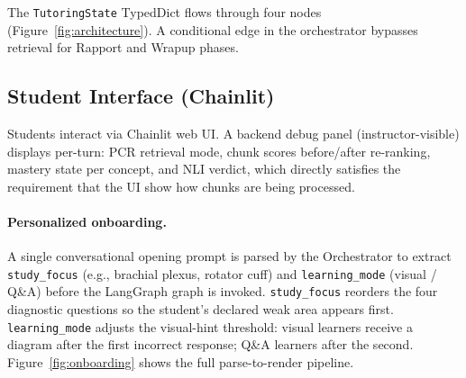 \documentclass[11pt]{article}
\begin{document}
The \texttt{TutoringState} TypedDict flows through four nodes
(Figure~\ref{fig:architecture}).
A conditional edge in the orchestrator bypasses retrieval for Rapport
and Wrapup phases.

\subsection{Student Interface (Chainlit)}

Students interact via Chainlit web UI.
A backend debug panel (instructor-visible) displays per-turn: PCR retrieval
mode, chunk scores before/after re-ranking, mastery state per concept, and
NLI verdict, which directly satisfies the requirement that the UI show how
chunks are being processed.

\paragraph{Personalized onboarding.}
A single conversational opening prompt is parsed by the Orchestrator to
extract \texttt{study\_focus} (e.g., brachial plexus, rotator cuff) and
\texttt{learning\_mode} (visual / Q\&A) before the LangGraph graph is
invoked.
\texttt{study\_focus} reorders the four diagnostic questions so the
student's declared weak area appears first.
\texttt{learning\_mode} adjusts the visual-hint threshold:
visual learners receive a diagram after the first incorrect response;
Q\&A learners after the second.
Figure~\ref{fig:onboarding} shows the full parse-to-render pipeline.
\end{document}
